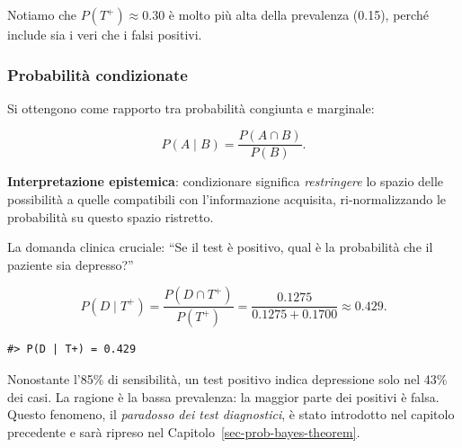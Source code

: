 \documentclass[
  italian,
  letterpaper,
  a4paper,
  11pt,
  open=any]{scrbook}
\theoremstyle{plain}
\theoremstyle{definition}
\theoremstyle{definition}
\theoremstyle{remark}
\begin{document}
Notiamo che \(P(T^+) \approx 0.30\) è molto più alta della prevalenza
(0.15), perché include sia i veri che i falsi positivi.

\subsubsection{Probabilità
condizionate}\label{probabilituxe0-condizionate}

Si ottengono come rapporto tra probabilità congiunta e marginale:

\[P(A \mid B) = \frac{P(A \cap B)}{P(B)}.\]

\textbf{Interpretazione epistemica}: condizionare significa
\emph{restringere} lo spazio delle possibilità a quelle compatibili con
l'informazione acquisita, ri-normalizzando le probabilità su questo
spazio ristretto.

\begin{tcolorbox}[enhanced jigsaw, arc=.35mm, bottomrule=.15mm, bottomtitle=1mm, breakable, colback=white, colbacktitle=quarto-callout-note-color!10!white, colframe=quarto-callout-note-color-frame, coltitle=black, left=2mm, leftrule=.75mm, opacityback=0, opacitybacktitle=0.6, rightrule=.15mm, title=\textcolor{quarto-callout-note-color}{\faInfo}\hspace{0.5em}{Esempio: valore predittivo positivo}, titlerule=0mm, toprule=.15mm, toptitle=1mm]

La domanda clinica cruciale: ``Se il test è positivo, qual è la
probabilità che il paziente sia depresso?''

\[P(D \mid T^+) = \frac{P(D \cap T^+)}{P(T^+)} = \frac{0.1275}{0.1275 + 0.1700} \approx 0.429.\]

\begin{verbatim}
#> P(D | T+) = 0.429
\end{verbatim}

Nonostante l'85\% di sensibilità, un test positivo indica depressione
solo nel 43\% dei casi. La ragione è la bassa prevalenza: la maggior
parte dei positivi è falsa. Questo fenomeno, il \emph{paradosso dei test
diagnostici}, è stato introdotto nel capitolo precedente e sarà ripreso
nel Capitolo~\ref{sec-prob-bayes-theorem}.

\end{tcolorbox}
\end{document}
